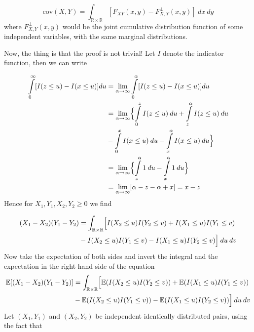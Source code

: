 \documentclass{article}
\begin{document}
\begin{equation}
\text{cov}(X,Y)=\int_{\mathbb{R}\times\mathbb{R}}[F_{XY}(x,y)-F_{X,Y}^\perp(x,y)]\>dx\>dy 
\end{equation}
where $F_{X,Y}^\perp(x,y)$  would be the joint cumulative distribution function of some independent variables, with the same marginal distributions.

Now, the thing is that the proof is not trivial! Let $I$ denote the indicator function, then we can write

\begin{equation}
    \begin{split}
        \int\limits_0^\infty [I(z\le u) - I(x\le u)] du & = \lim\limits_{\alpha \rightarrow \infty}
        \int\limits_0^\alpha [I(z\le u) - I(x\le u)] du \\
        & = \lim\limits_{\alpha \rightarrow \infty} \Bigl\{\int\limits_0^z I(z\le u) \> du + \int\limits_z^\alpha I(z\le u) \> du \\
        & - \int\limits_0^x I(x\le u) \> du - \int\limits_x^\alpha I(x\le u) \> du \Bigr\} \\
        & = \lim\limits_{\alpha \rightarrow \infty}
             \Bigl\{ \int\limits_z^\alpha 1 \> du - \int\limits_x^\alpha 1 \> du \Bigr\} \\
        & = \lim\limits_{\alpha \rightarrow \infty} [ \alpha - z - \alpha + x]  = x - z
    \end{split}
\end{equation}
Hence for $X_1, Y_1, X_2, Y_2 \ge 0$ we find

\begin{equation}
    \begin{split}
        (X_1 - X_2)(Y_1 - Y_2) & = \int_{\mathbb{R}\times\mathbb{R}} \Bigl[
        I(X_2\le u)I(Y_2\le v) + I(X_1\le u)I(Y_1\le v) \\
        & - I(X_2\le u)I(Y_1\le v) - I(X_1\le u)I(Y_2\le v) 
        \Bigr] \>du\>dv
    \end{split}
\end{equation}
Now take the expectation of both sides and invert the integral and the expectation in the right hand side of the equation
\begin{equation}
    \begin{split}
        \mathbb{E}[(X_1 - X_2)(Y_1 - Y_2)] & = \int_{\mathbb{R}\times\mathbb{R}} \Bigl[
        \mathbb{E}(I(X_2\le u)I(Y_2\le v)) + \mathbb{E}(I(X_1\le u)I(Y_1\le v)) \\
        & - \mathbb{E}(I(X_2\le u)I(Y_1\le v)) - \mathbb{E}(I(X_1\le u)I(Y_2\le v)) 
        \Bigr] \>du\>dv
    \end{split}
\end{equation}
Let $(X_1, Y_1)$ and $(X_2, Y_2)$ be independent identically distributed pairs, using the fact that
\end{document}
